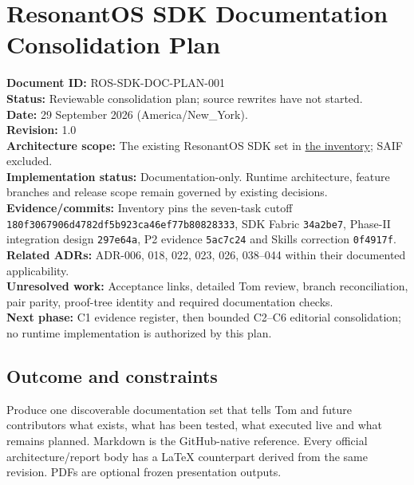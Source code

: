 \documentclass[
  11pt,
]{article}
\author{}
\date{}
\begin{document}
\hypertarget{resonantos-sdk-documentation-consolidation-plan}{%
\section{ResonantOS SDK Documentation Consolidation
Plan}\label{resonantos-sdk-documentation-consolidation-plan}}

\textbf{Document ID:} ROS-SDK-DOC-PLAN-001\\
\textbf{Status:} Reviewable consolidation plan; source rewrites have not
started.\\
\textbf{Date:} 29 September 2026 (America/New\_York).\\
\textbf{Revision:} 1.0\\
\textbf{Architecture scope:} The existing ResonantOS SDK set in
\href{SDK-DOCUMENTATION-INDEX.md}{the inventory}; SAIF excluded.\\
\textbf{Implementation status:} Documentation-only. Runtime
architecture, feature branches and release scope remain governed by
existing decisions.\\
\textbf{Evidence/commits:} Inventory pins the seven-task cutoff
\nolinkurl{180f3067906d4782df5b923ca46ef77b80828333}, SDK Fabric
\nolinkurl{34a2be7}, Phase-II integration design \nolinkurl{297e64a}, P2
evidence \nolinkurl{5ac7c24} and Skills correction \nolinkurl{0f4917f}.\\
\textbf{Related ADRs:} ADR-006, 018, 022, 023, 026, 038--044 within
their documented applicability.\\
\textbf{Unresolved work:} Acceptance links, detailed Tom review, branch
reconciliation, pair parity, proof-tree identity and required
documentation checks.\\
\textbf{Next phase:} C1 evidence register, then bounded C2--C6 editorial
consolidation; no runtime implementation is authorized by this plan.

\hypertarget{outcome-and-constraints}{%
\subsection{Outcome and constraints}\label{outcome-and-constraints}}

Produce one discoverable documentation set that tells Tom and future
contributors what exists, what has been tested, what executed live and
what remains planned. Markdown is the GitHub-native reference. Every
official architecture/report body has a LaTeX counterpart derived from
the same revision. PDFs are optional frozen presentation outputs.
\end{document}
